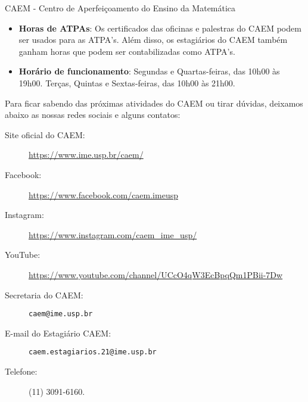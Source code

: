 \begin{secao}{CAEM - Centro de Aperfeiçoamento do Ensino da Matemática}
\begin{itemize}
\item \textbf{Horas de ATPAs}: Os certificados das oficinas e palestras
do CAEM podem ser usados para as ATPA's. Além disso, os estagiários do
CAEM também ganham horas que podem ser contabilizadas como ATPA's.

\item \textbf{Horário de funcionamento}: Segundas e Quartas-feiras,
  das 10h00 às 19h00. Terças, Quintas e Sextas-feiras, das 10h00 às
  21h00.
  
\end{itemize}

\pagebreak %

Para ficar sabendo das próximas atividades do CAEM ou tirar dúvidas,
deixamos abaixo as nossas redes sociais e alguns contatos:

\begin{description}

    \item[Site oficial do CAEM:] \url{https://www.ime.usp.br/caem/}

    \item[Facebook:] \url{https://www.facebook.com/caem.imeusp}

    \item[Instagram:] \url{https://www.instagram.com/caem_ime_usp/}

    \item[YouTube:] \url{https://www.youtube.com/channel/UCcO4qW3EcBpqQm1PBii-7Dw}

    \item[Secretaria do CAEM:] \texttt{caem@ime.usp.br}

    \item[E-mail do Estagiário CAEM:] \texttt{caem.estagiarios.21@ime.usp.br}

    \item[Telefone:] (11) 3091-6160.

\end{description}

\end{secao}
